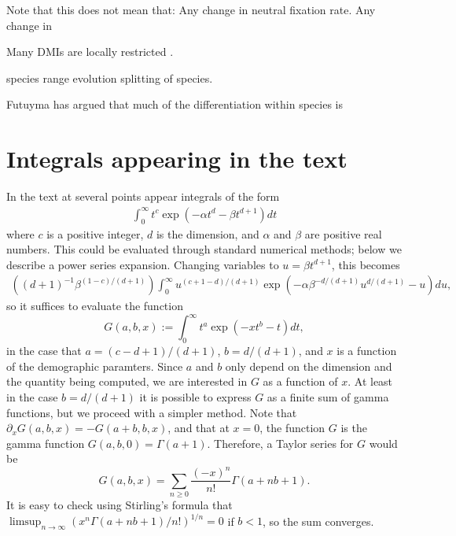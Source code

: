 \documentclass{article}
\begin{document}
Note that this does not mean that:
Any change in neutral fixation rate.
Any change in  

Many DMIs are locally restricted \citep{Cutter:12}.

species range evolution
splitting of species.
\citep{Rosenblum:12}


Futuyma has argued that much of the differentiation within species is \citep{Futuyma:10,FUTUYMA:87}



\appendix

\section{Integrals appearing in the text}
    \label{apx:integrals}

In the text at several points appear integrals of the form
\begin{align}
  \int_0^\infty t^c \exp \left( - \alpha t^d - \beta t^{d+1} \right) dt 
\end{align}
where $c$ is a positive integer, $d$ is the dimension, and $\alpha$ and $\beta$ are positive real numbers.
This could be evaluated through standard numerical methods; below we describe a power series expansion.
Changing variables to $u = \beta t^{d+1}$, this becomes
\begin{align}
    \left( (d+1)^{-1} \beta^{ (1-c)/(d+1) } \right) \int_0^\infty u^{(c+1-d)/(d+1)} \exp\left( - \alpha \beta^{-d/(d+1)} u^{d/(d+1)} - u \right) du ,
\end{align}
so it suffices to evaluate the function
\begin{equation}
    G(a,b,x) := \int_0^\infty  t^a \exp\left( -x t^b - t \right) dt ,
\end{equation}
in the case that $a=(c-d+1)/(d+1)$, $b=d/(d+1)$, and $x$ is a function of the demographic paramters.
Since $a$ and $b$ only depend on the dimension and the quantity being computed,
we are interested in $G$ as a function of $x$.
At least in the case $b=d/(d+1)$ it is possible to express $G$ as a finite sum of gamma functions,
but we proceed with a simpler method.
Note that $\partial_x G(a,b,x) = -G(a+b,b,x)$,
and that at $x=0$, the function $G$ is the gamma function $G(a,b,0) = \Gamma(a+1)$.
Therefore, a Taylor series for $G$ would be
\[
    G(a,b,x) = \sum_{n \ge 0} \frac{(-x)^n}{n!} \Gamma(a+nb+1) .
\]
It is easy to check using Stirling's formula that $\limsup_{n \to \infty} ( x^n \Gamma(a+nb+1)/n! )^{1/n} = 0$
if $b<1$, so the sum converges.
\end{document}
